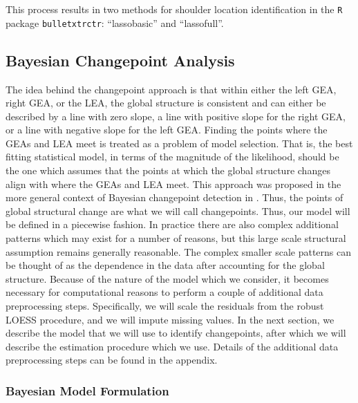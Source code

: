 \documentclass[12pt]{article}
\begin{document}
This process results in two methods for shoulder location identification
in the \texttt{R} package \texttt{bulletxtrctr}: ``lassobasic'' and
``lassofull''.

\subsection{Bayesian Changepoint Analysis}

The idea behind the changepoint approach is that within either the left
GEA, right GEA, or the LEA, the global structure is consistent and can
either be described by a line with zero slope, a line with positive
slope for the right GEA, or a line with negative slope for the left GEA.
Finding the points where the GEAs and LEA meet is treated as a problem
of model selection. That is, the best fitting statistical model, in
terms of the magnitude of the likelihood, should be the one which
assumes that the points at which the global structure changes align with
where the GEAs and LEA meet. This approach was proposed in the more
general context of Bayesian changepoint detection in
\citet{stephens1994}. Thus, the points of global structural change are
what we will call changepoints. Thus, our model will be defined in a
piecewise fashion. In practice there are also complex additional
patterns which may exist for a number of reasons, but this large scale
structural assumption remains generally reasonable. The complex smaller
scale patterns can be thought of as the dependence in the data after
accounting for the global structure. Because of the nature of the model
which we consider, it becomes necessary for computational reasons to
perform a couple of additional data preprocessing steps. Specifically,
we will scale the residuals from the robust LOESS procedure, and we will
impute missing values. In the next section, we describe the model that
we will use to identify changepoints, after which we will describe the
estimation procedure which we use. Details of the additional data
preprocessing steps can be found in the appendix.

\subsubsection{Bayesian Model Formulation}
\end{document}
